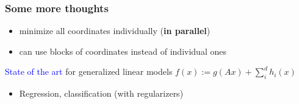 \documentclass[aspectratio=149]{beamer}
\begin{document}
\begin{frame}
  \frametitle{Some more thoughts}
  \begin{itemize}
    \item minimize all coordinates individually (\textbf{in parallel})
    \item can use blocks of coordinates instead of individual ones
  \end{itemize}

  \textcolor{blue}{State of the art} for generalized linear models $f(x) := g(Ax) + \sum_{i}^{d} h_i(x)$
  \begin{itemize}
    \item Regression, classification (with regularizers)
  \end{itemize}
\end{frame}
\end{document}
